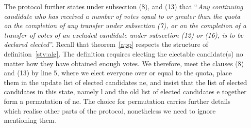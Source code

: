 \documentclass{llncs}
\begin{document}
The protocol further states under subsection (8), and (13) that \lq\lq \emph{Any continuing candidate who has received a number of votes equal to
or greater than the quota on the completion of any transfer under subsection (7), or on the completion of a transfer of votes of an
excluded candidate under subsection (12) or (16), is to be declared elected}\rq\rq. Recall that theorem~\ref{app} respects the structure of definition~\ref{stv:alg}.  The definition requires electing the electable candidate(s) no matter how they have obtained enough votes. We therefore, meet the clauses (8) and (13) by line 5, where we elect everyone over or equal to the quota, place them in the update list of elected candidates {\selectfont ne}, and insist that the list of elected candidates in this state, namely {\selectfont l} and the old list of elected candidates {\selectfont e} together form a permutation of {\selectfont ne}. The choice for permutation carries further details which realise other parts of the protocol, nonetheless we need to ignore mentioning them.   
\end{document}
